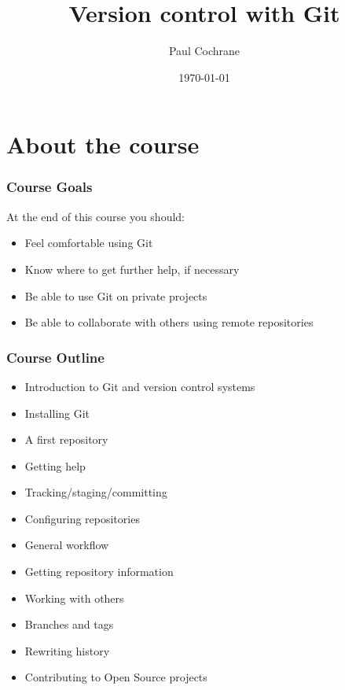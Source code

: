 \documentclass{git_course}
\begin{document}
\author{Paul Cochrane}
\title[Version control with Git]
        {Version control with Git}
\date{\today}

\maketitle

\begin{frame}
\begin{multicols}{2}
\begin{spacing}{0.8}
\tableofcontents
\end{spacing}
\end{multicols}
\end{frame}


\section{About the course}

\begin{frame}
\frametitle{Course Goals}

At the end of this course you should:

\begin{itemize}
    \item Feel comfortable using Git
    \item Know where to get further help, if necessary
    \item Be able to use Git on private projects
    \item Be able to collaborate with others using remote repositories
\end{itemize}
\end{frame}

\begin{frame}
\frametitle{Course Outline}
\begin{itemize}
    \item Introduction to Git and version control systems
    \item Installing Git
    \item A first repository
    \item Getting help
    \item Tracking/staging/committing
    \item Configuring repositories
    \item General workflow
    \item Getting repository information
    \item Working with others
    \item Branches and tags
    \item Rewriting history
    \item Contributing to Open Source projects
\end{itemize}
\end{frame}
\end{document}

